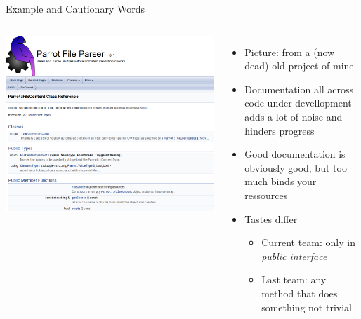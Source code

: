 
\begin{frame}{Example and Cautionary Words}
%
\begin{columns}
\includegraphics[width=\linewidth]{./gfx/15-parrot}
%
\begin{itemize}
\item Picture: from a (now dead) old project of mine
\item Documentation all across code under devellopment adds a lot of noise and hinders progress
\item Good documentation is obviously good, but too much binds your ressources
\item Tastes differ
	\begin{itemize}
	\item Current team: only in \emph{public interface}
	\item Last team: any method that does something not trivial
	\end{itemize}
\end{itemize}
\end{columns}

%
\end{frame}


